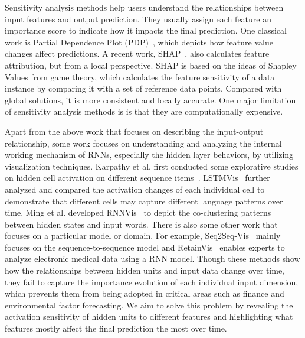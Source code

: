 Sensitivity analysis methods help users understand the relationships between input features and output prediction.
They usually assign each feature an importance score to indicate how it impacts the final prediction.
One classical work is Partial Dependence Plot (PDP)~\cite{friedman2001greedy}, which depicts how feature value changes affect predictions.
A recent work, SHAP~\cite{lundberg2017unified}, also calculates feature attribution, but from a local perspective.
SHAP is based on the ideas of Shapley Values from game theory, which calculates the feature sensitivity of a data instance by comparing it with a set of reference data points.
Compared with global solutions, it is more consistent and locally accurate.
One major limitation of sensitivity analysis methods is is that they are computationally expensive. 


Apart from the above work that focuses on describing the input-output relationship,
some work focuses on understanding and analyzing the internal working mechanism of RNNs, especially the hidden layer behaviors, by utilizing visualization techniques.
Karpathy et al. first conducted some explorative studies on hidden cell activation on different sequence items~\cite{karpathy2015visualizing}.
LSTMVis~\cite{strobelt2018lstmvis} further analyzed and compared the activation changes of each individual cell to demonstrate that different cells may capture different language patterns over time.
Ming et al. developed RNNVis~\cite{ming2017understanding} to depict the co-clustering patterns between hidden states and input words.
There is also some other work that focuses on a particular model or domain.
For example, Seq2Seq-Vis~\cite{strobelt2019s} mainly focuses on the sequence-to-sequence model and RetainVis~\cite{kwon2019retainvis} enables experts to analyze electronic medical data using a RNN model.
Though these methods show how the relationships between hidden units and input data change over time, they fail to capture the importance evolution of each individual input dimension, which prevents them from being adopted in critical areas such as finance and environmental factor forecasting.
We aim to solve this problem by revealing the activation sensitivity of hidden units to different features and highlighting what features mostly affect the final prediction the most over time.


